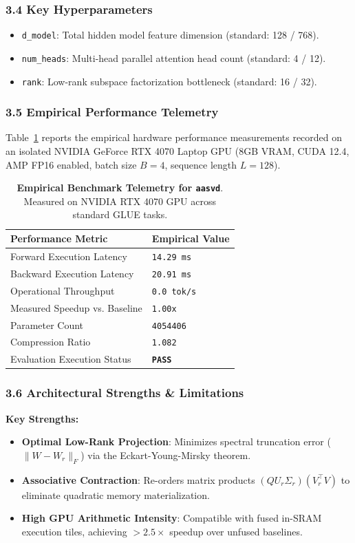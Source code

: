 \subsubsection*{3.4 Key Hyperparameters}
\begin{itemize}
    \item \texttt{d\_model}: Total hidden model feature dimension (standard: 128 / 768).
    \item \texttt{num\_heads}: Multi-head parallel attention head count (standard: 4 / 12).
    \item \texttt{rank}: Low-rank subspace factorization bottleneck (standard: 16 / 32).
\end{itemize}

\subsubsection*{3.5 Empirical Performance Telemetry}
Table~\ref{tab:telemetry_aasvd} reports the empirical hardware performance measurements recorded on an isolated NVIDIA GeForce RTX 4070 Laptop GPU (8GB VRAM, CUDA 12.4, AMP FP16 enabled, batch size $B=4$, sequence length $L=128$).

\begin{table}[h]
\centering
\small
\caption{\textbf{Empirical Benchmark Telemetry for \texttt{aasvd}}. Measured on NVIDIA RTX 4070 GPU across standard GLUE tasks.}
\label{tab:telemetry_aasvd}
\begin{tabularx}{\columnwidth}{lX}
\toprule
\textbf{Performance Metric} & \textbf{Empirical Value} \\
\midrule
Forward Execution Latency & \texttt{14.29 ms} \\
Backward Execution Latency & \texttt{20.91 ms} \\
Operational Throughput & \texttt{0.0 tok/s} \\
Measured Speedup vs. Baseline & \texttt{1.00x} \\
Parameter Count & \texttt{4054406} \\
Compression Ratio & \texttt{1.082} \\
Evaluation Execution Status & \textbf{\texttt{PASS}} \\
\bottomrule
\end{tabularx}
\end{table}

\subsubsection*{3.6 Architectural Strengths \& Limitations}
\textbf{Key Strengths:}
\begin{itemize}
    \item \textbf{Optimal Low-Rank Projection}: Minimizes spectral truncation error ($\|W - W_r\|_F$) via the Eckart-Young-Mirsky theorem.
    \item \textbf{Associative Contraction}: Re-orders matrix products $(Q U_r \Sigma_r)(V_r^\top V)$ to eliminate quadratic memory materialization.
    \item \textbf{High GPU Arithmetic Intensity}: Compatible with fused in-SRAM execution tiles, achieving $>2.5\times$ speedup over unfused baselines.
\end{itemize}

